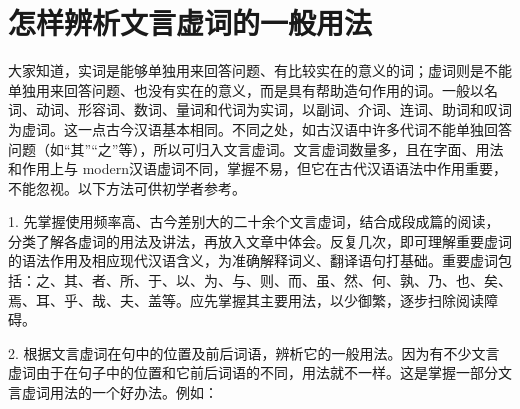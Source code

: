 \section{怎样辨析文言虚词的一般用法}

大家知道，实词是能够单独用来回答问题、有比较实在的意义的词；虚词则是不能单独用来回答问题、也没有实在的意义，而是具有帮助造句作用的词。一般以名词、动词、形容词、数词、量词和代词为实词，以副词、介词、连词、助词和叹词为虚词。这一点古今汉语基本相同。不同之处，如古汉语中许多代词不能单独回答问题（如“其”“之”等），所以可归入文言虚词。文言虚词数量多，且在字面、用法和作用上与 modern汉语虚词不同，掌握不易，但它在古代汉语语法中作用重要，不能忽视。以下方法可供初学者参考。

1. 先掌握使用频率高、古今差别大的二十余个文言虚词，结合成段成篇的阅读，分类了解各虚词的用法及讲法，再放入文章中体会。反复几次，即可理解重要虚词的语法作用及相应现代汉语含义，为准确解释词义、翻译语句打基础。重要虚词包括：之、其、者、所、于、以、为、与、则、而、虽、然、何、孰、乃、也、矣、焉、耳、乎、哉、夫、盖等。应先掌握其主要用法，以少御繁，逐步扫除阅读障碍。

2. 根据文言虚词在句中的位置及前后词语，辨析它的一般用法。因为有不少文言虚词由于在句子中的位置和它前后词语的不同，用法就不一样。这是掌握一部分文言虚词用法的一个好办法。例如：


